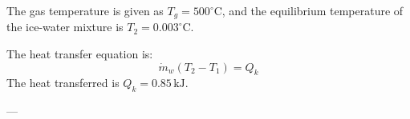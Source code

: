 The gas temperature is given as \( T_g = 500^\circ\text{C} \), and the equilibrium temperature of the ice-water mixture is \( T_{2} = 0.003^\circ\text{C} \).  

The heat transfer equation is:  
\[
\dot{m}_w (T_2 - T_1) = Q_k
\]  
The heat transferred is \( Q_k = 0.85 \, \text{kJ} \).  

---